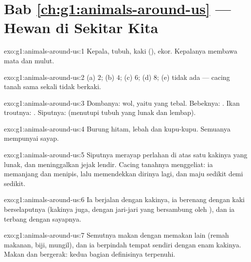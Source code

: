 \section*{Bab \ref{ch:g1:animals-around-us} --- Hewan di Sekitar Kita}

\begin{solution}{exo:g1:animals-around-us:1}
Kepala, tubuh, kaki (), ekor. Kepalanya membawa mata dan
mulut.
\end{solution}

\begin{solution}{exo:g1:animals-around-us:2}
(a) $2$; (b) $4$; (c) $6$; (d) $8$; (e) tidak ada --- cacing tanah
sama sekali tidak berkaki.
\end{solution}

\begin{solution}{exo:g1:animals-around-us:3}
Dombanya: wol, yaitu  yang tebal. Bebeknya: . Ikan
troutnya: . Siputnya:  (menutupi tubuh yang lunak dan
lembap).
\end{solution}

\begin{solution}{exo:g1:animals-around-us:4}
Burung hitam, lebah dan kupu-kupu. Semuanya mempunyai sayap.
\end{solution}

\begin{solution}{exo:g1:animals-around-us:5}
Siputnya merayap perlahan di atas satu kakinya yang lunak, dan
meninggalkan jejak lendir. Cacing tanahnya menggeliat: ia memanjang
dan menipis, lalu memendekkan dirinya lagi, dan maju sedikit demi
sedikit.
\end{solution}

\begin{solution}{exo:g1:animals-around-us:6}
Ia berjalan dengan kakinya, ia berenang dengan kaki berselaputnya
(kakinya juga, dengan jari-jari yang bersambung oleh ), dan ia
terbang dengan sayapnya.
\end{solution}

\begin{solution}{exo:g1:animals-around-us:7}
Semutnya makan dengan memakan  lain (remah makanan,
biji,  mungil), dan ia berpindah tempat sendiri dengan enam
kakinya. Makan dan bergerak: kedua bagian definisinya terpenuhi.
\end{solution}


